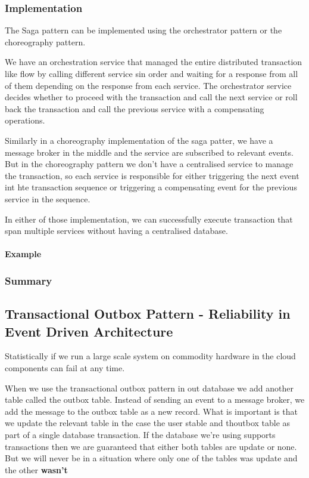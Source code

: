 \subsubsection{Implementation}
The Saga pattern can be implemented using the orchestrator pattern or the choreography pattern.

We have an orchestration service that managed the entire distributed transaction like flow by calling different service sin order and waiting for a response from all of them depending on the response from each service.
The orchestrator service decides whether to proceed with the transaction and call the next service or roll back the transaction and call the previous service with a compensating operations.

Similarly in a choreography implementation of the saga patter, we have a message broker in the middle and the service are subscribed to relevant events.
But in the choreography pattern we don't have a centralised service to manage the transaction, so each service is responsible for either triggering the next event int hte transaction sequence or triggering a compensating event for the previous service in the sequence.

In either of those implementation, we can successfully execute transaction that span multiple services without having a centralised database.

\paragraph{Example}

\subsubsection{Summary}

\subsection{Transactional Outbox Pattern - Reliability in Event Driven Architecture}
Statistically if we run a large scale system on commodity hardware in the cloud components can fail at any time.

When we use the transactional outbox pattern in out database we add another table called the outbox table.
Instead of sending an event to a message broker, we add the message to the outbox table as a new record.
What is important is that we update the relevant table in the case the user stable and thoutbox table as part of a single database transaction.
If the database we're using supports transactions then we are guaranteed that either both tables are update or none.
But we will never be in a situation where only one of the tables was update and the other \textbf{wasn't}

